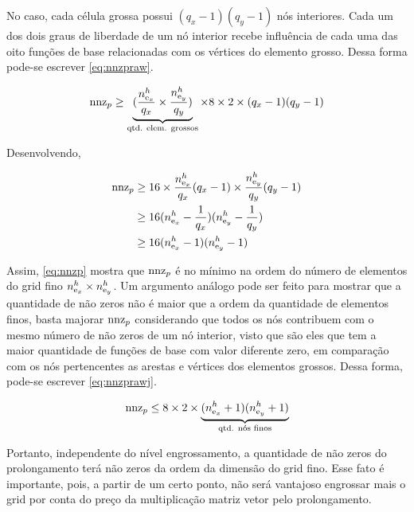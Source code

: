 No caso, cada célula grossa possui $(q_x-1)(q_y-1)$ nós interiores. Cada um dos dois graus de liberdade de um nó interior recebe influência de cada uma das oito funções de base relacionadas com os vértices do elemento grosso. Dessa forma pode-se escrever \eqref{eq:nnzpraw}.

\begin{equation} \label{eq:nnzpraw}
    \text{nnz}_p \ge  \underbrace{(\frac{n_{\text{e}_x}^h}{q_x} \times \frac{n_{\text{e}_y}^h}{q_y})}_{\text{qtd. elem. grossos}} \times 8 \times 2 \times (q_x-1)(q_y-1)
\end{equation}

Desenvolvendo,

\begin{align}
     \text{nnz}_p   & \ge  16 \times  \frac{n_{\text{e}_x}^h}{q_x} (q_x-1) \times \frac{n_{\text{e}_y}^h}{q_y} (q_y-1) \nonumber  \\
                & \ge  16   (n_{\text{e}_x}^h - \frac{1}{q_x})  (n_{\text{e}_y}^h - \frac{1}{q_y}) \nonumber   \\
                & \ge  16   (n_{\text{e}_x}^h - 1)  (n_{\text{e}_y}^h - 1) \label{eq:nnzp}
\end{align}

Assim, \eqref{eq:nnzp} mostra que $\text{nnz}_p$ é no mínimo na ordem do número de elementos do grid fino $n_{\text{e}_x}^h\times n_{\text{e}_y}^h$. Um argumento análogo pode ser feito para mostrar que a quantidade de não zeros não é maior que a ordem da quantidade de elementos finos, basta majorar $\text{nnz}_p$ considerando que todos os nós contribuem com o mesmo número de não zeros de um nó interior, visto que são eles que tem a maior quantidade de funções de base com valor diferente zero, em comparação com os nós pertencentes as arestas e vértices dos elementos grossos. Dessa forma, pode-se escrever \eqref{eq:nnzprawj}.

\begin{equation}\label{eq:nnzprawj}
    \text{nnz}_p \le 8 \times 2 \times \underbrace{(n_{\text{e}_x}^h + 1)(n_{\text{e}_y}^h + 1)}_{\text{qtd. nós finos}}
\end{equation}


Portanto, independente do nível engrossamento, a quantidade de não zeros do prolongamento terá não zeros da ordem da dimensão do grid fino. Esse fato é importante, pois, a partir de um certo ponto, não será vantajoso engrossar mais o grid por conta do preço da multiplicação matriz vetor pelo prolongamento.